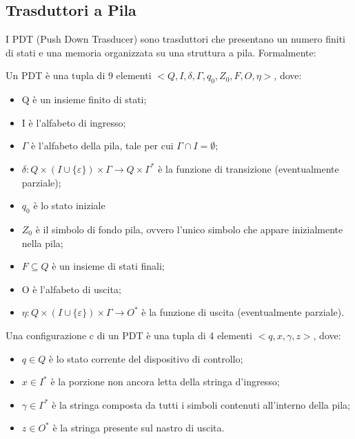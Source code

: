   \subsection{Trasduttori a Pila}
  I PDT (Push Down Trasducer) sono trasduttori che presentano un numero finiti di stati  e una memoria organizzata su una struttura a pila. Formalmente:

  \begin{definition}
    Un PDT è una tupla di 9 elementi \(<Q, I, \delta, \Gamma, q_0, Z_0, F, O, \eta>\), dove:
    \begin{itemize}
      \item Q è un insieme finito di stati;
      \item I è l'alfabeto di ingresso;
      \item \(\Gamma\) è l'alfabeto della pila, tale per cui \(\Gamma \cap I = \emptyset\);
      \item \(\delta:Q\times (I\cup \{\varepsilon\})\times \Gamma \to Q \times \Gamma^*\) è la funzione di transizione (eventualmente parziale);
      \item \(q_0\) è lo stato iniziale
      \item \(Z_0\) è il simbolo di fondo pila, ovvero l'unico simbolo che appare inizialmente nella pila;
      \item \(F\subseteq Q\) è un insieme di stati finali;
      \item O è l'alfabeto di uscita;
      \item \(\eta: Q\times (I \cup \{\varepsilon\})\times \Gamma \to O^*\) è la funzione di uscita (eventualmente parziale).
    \end{itemize}    
  \end{definition}

  \begin{definition}
    Una configurazione c di un PDT è una tupla di 4 elementi \(<q,x,\gamma, z>\), dove:
    \begin{itemize}
      \item \(q \in Q\) è lo stato corrente del dispositivo di controllo;
      \item \(x \in I^*\) è la porzione non ancora letta della stringa d'ingresso;
      \item \(\gamma \in \Gamma^*\) è la stringa composta da tutti i simboli contenuti all'interno della pila;
      \item \(z \in O^*\) è la stringa presente sul nastro di uscita.
    \end{itemize}
  \end{definition}

